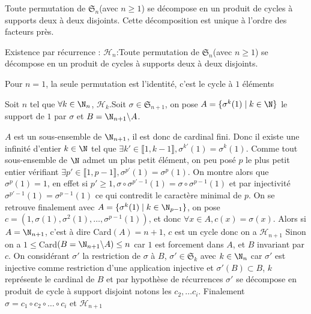 \begin{theoreme}
    Toute permutation de $\mathfrak{S}_n$(avec $n\geq1$) se décompose en un produit de cycles à supports deux à deux disjoints. Cette décomposition est unique à l'ordre des facteurs près.
    
    \tcblower
    Existence par récurrence : $\mathcal{H}_n$:Toute permutation de $\mathfrak{S}_n$(avec $n\geq1$) se décompose en un produit de cycles à supports deux à deux disjoints.
    
    Pour $n=1$, la seule permutation est l'identité, c'est le cycle à $1$ éléments

    Soit $n$ tel que $\forall k\in\N_n$, $\mathcal{H}_k$.Soit $\sigma\in\mathfrak{S}_{n+1}$, on pose $A=\{\sigma^k(1)\mid k\in\N\}$ le support de $1$ par $\sigma$ et $B=\N_{n+1}\backslash A$.

    $A$ est un sous-ensemble de $\N_{n+1}$, il est donc de cardinal fini. Donc il existe une infinité d'entier $k\in\N$ tel que $\exists k'\in\llbracket 1,k-1\rrbracket,\sigma^{k'}(1)=\sigma^k(1)$.
    Comme tout sous-ensemble de $\N$ admet un plus petit élément, on peu posé $p$ le plus petit entier vérifiant $\exists p'\in\llbracket 1,p-1\rrbracket,\sigma^{p'}(1)=\sigma^p(1)$. On montre alors que $\sigma^p(1)=1$, en effet si $p'\geq 1,\sigma\circ\sigma^{p'-1}(1)=\sigma\circ\sigma^{p-1}(1)$ et par injectivité $\sigma^{p'-1}(1)=\sigma^{p-1}(1)$ ce qui contredit le caractère minimal de $p$.
    On se retrouve finalement avec $A=\{\sigma^k(1)\mid k\in\N_{p-1}\}$, on pose $c=(1,\sigma(1),\sigma^2(1),\dots,\sigma^{p-1}(1))$, et donc $\forall x\in A, c(x)=\sigma(x)$.
    Alors si $A=\N_{n+1}$, c'est à dire Card$(A)=n+1$, $c$ est un cycle donc on a $\mathcal{H}_{n+1}$
    Sinon on a $1\leq$Card$(B=\N_{n+1}\backslash A)\leq n$ car $1$ est forcement dans $A$, et $B$ invariant par $c$. On considérant $\sigma'$ la restriction de $\sigma$ à $B$, $\sigma'\in\mathfrak{S}_k$ avec $k\in\N_n$ car $\sigma'$ est injective comme restriction d'une application injective et $\sigma'(B)\subset B$, $k$ représente le cardinal de $B$ et par hypothèse de récurrences $\sigma'$ se décompose en produit de cycle à support disjoint notons les $c_2,\dots c_i$.
    Finalement $\sigma=c_1\circ c_2\circ\dots\circ c_i$ et $\mathcal{H}_{n+1}$
    
\end{theoreme}
\begin{theoreme}
    
\end{theoreme}
